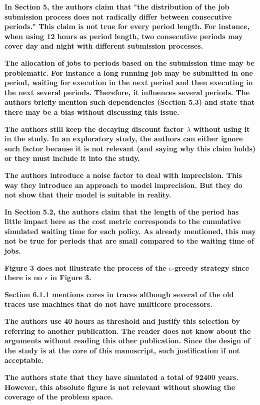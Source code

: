 \documentclass[]{article}
\begin{document}
\textbf{In Section 5, the authors claim that "the distribution of the job submission process does not radically differ between
consecutive periods." This claim is not true for every period length. For instance, when using 12 hours as period
length, two consecutive periods may cover day and night with different submission processes.
}

\textbf{The allocation of jobs to periods based on the submission time may be problematic. For instance a long running job may
be submitted in one period, waiting for execution in the next period and then executing in the next several periods.
Therefore, it influences several periods. The authors briefly mention such dependencies (Section 5.3) and state that
there may be a bias without discussing this issue.
}

\textbf{The authors still keep the decaying discount factor $\lambda$ without using it in the study. In an exploratory study, the
authors can either ignore such factor because it is not relevant (and saying why this claim holds) or they must include
it into the study.
}

\textbf{The authors introduce a noise factor to deal with imprecision. This way they introduce an approach to model
imprecision. But they do not show that their model is suitable in reality.
}

\textbf{In Section 5.2, the authors claim that the length of the period has little impact here as the cost metric corresponds
to the cumulative simulated waiting time for each policy. As already mentioned, this may not be true for periods that
are small compared to the waiting time of jobs.
}

\textbf{Figure 3 does not illustrate the process of the $\epsilon$-greedy strategy since there is no $\epsilon$ in Figure 3.
}

\textbf{Section 6.1.1 mentions cores in traces although several of the old traces use machines that do not have multicore
processors.
}

\textbf{The authors use 40 hours as threshold and justify this selection by referring to another publication. The reader does
not know about the arguments without reading this other publication. Since the design of the study is at the core of
this manuscript, such justification if not acceptable.
}

\textbf{The authors state that they have simulated a total of 92400 years. However, this absolute figure is not relevant
without showing the coverage of the problem space.
}
\end{document}
